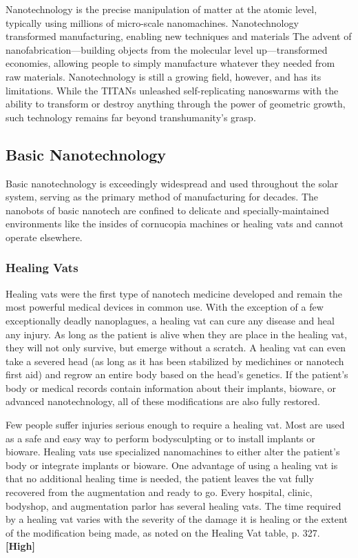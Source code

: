 Nanotechnology is the precise manipulation of matter 
at the atomic level, typically using millions of micro-scale
nanomachines. Nanotechnology transformed
manufacturing, enabling new techniques and materials
The advent of nanofabrication—building objects
from the molecular level up—transformed economies, 
allowing people to simply manufacture whatever they 
needed from raw materials. Nanotechnology is still a 
growing field, however, and has its limitations. While 
the TITANs unleashed self-replicating nanoswarms 
with the ability to transform or destroy anything 
through the power of geometric growth, such technology
remains far beyond transhumanity's grasp.

\subsection{Basic Nanotechnology}

Basic nanotechnology is exceedingly widespread 
and used throughout the solar system, serving as the 
primary method of manufacturing for decades. The 
nanobots of basic nanotech are confined to delicate 
and specially-maintained environments like the 
insides of cornucopia machines or healing vats and 
cannot operate elsewhere.

\subsubsection{Healing Vats}

Healing vats were the first type of nanotech medicine 
developed and remain the most powerful medical 
devices in common use. With the exception of a few 
exceptionally deadly nanoplagues, a healing vat can 
cure any disease and heal any injury. As long as the 
patient is alive when they are place in the healing 
vat, they will not only survive, but emerge without a 
scratch. A healing vat can even take a severed head (as 
long as it has been stabilized by medichines or nanotech
first aid) and regrow an entire body based on the
head's genetics. If the patient's body or medical records 
contain information about their implants, bioware, or 
advanced nanotechnology, all of these modifications 
are also fully restored.

Few people suffer injuries serious enough to require 
a healing vat. Most are used as a safe and easy way 
to perform bodysculpting or to install implants or 
bioware. Healing vats use specialized nanomachines 
to either alter the patient's body or integrate implants 
or bioware. One advantage of using a healing vat is 
that no additional healing time is needed, the patient 
leaves the vat fully recovered from the augmentation 
and ready to go. Every hospital, clinic, bodyshop, and 
augmentation parlor has several healing vats. The 
time required by a healing vat varies with the severity
of the damage it is healing or the extent of the
modification being made, as noted on the Healing Vat 
table, p. 327. \textbf{[High]}

